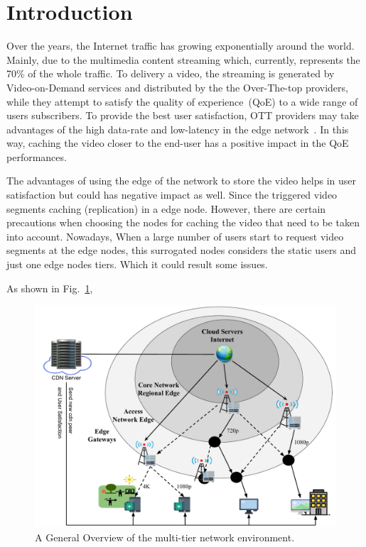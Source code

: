 \section{Introduction}
\label{sec:introduction}


Over the years, the Internet traffic has growing exponentially around the world. Mainly, due to the multimedia content streaming which, currently, represents the 70\% of the whole traffic. To delivery a video, the streaming is generated by Video-on-Demand services and distributed by the the Over-The-top providers, while they attempt to satisfy the quality of experience~(QoE) to a wide range of users subscribers. To provide the best user satisfaction, OTT providers may take advantages of the high data-rate and low-latency in the edge network~\cite{DBLP:CoRR:2021}. In this way, caching the video closer to the end-user has a positive impact in the QoE performances.

The advantages of using the edge of the network to store the video helps in user satisfaction but could has negative impact as well. Since the triggered video segments caching (replication) in a edge node.
However, there are certain precautions when choosing the nodes for caching the video that need to be taken into account. 
Nowadays, When a large number of users start to request video segments at the edge nodes, this surrogated nodes considers the static users and just one edge nodes tiers. Which it could result some issues. 

As shown in Fig.~\ref{fig:multi-tier-network}, 

\begin{figure}
    \centering
    \includegraphics[width=0.9\linewidth]{images/arch-video-content.pdf}
    \caption{A General Overview of the multi-tier network environment.}
    \label{fig:multi-tier-network}
\end{figure}

